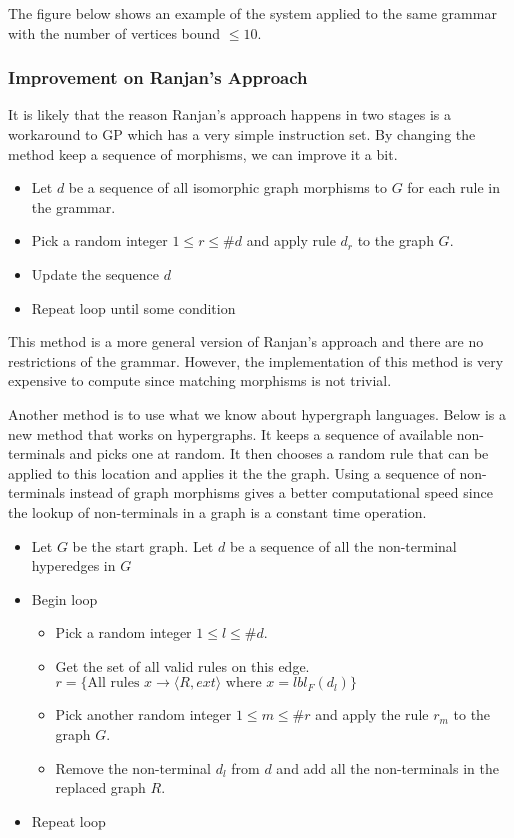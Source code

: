   The figure below shows an example of the system applied to the same grammar with the number of vertices bound $\leq 10$.
  


  \subsubsection{Improvement on Ranjan's Approach}

    It is likely that the reason Ranjan's approach happens in two stages is a workaround to GP which has a very simple instruction set. By changing the method keep a sequence of morphisms, we can improve it a bit.

    \begin{itemize}
    \item Let $d$ be a sequence of all isomorphic graph morphisms to $G$ for each rule in the grammar.
    \item Pick a random integer $1 \leq r \leq \#d$ and apply rule $d_r$ to the graph $G$.
    \item Update the sequence $d$
    \item Repeat loop until some condition
    \end{itemize}

    This method is a more general version of Ranjan's approach and there are no restrictions of the grammar. However, the implementation of this method is very expensive to compute since matching morphisms is not trivial.

    Another method is to use what we know about hypergraph languages. Below is a new method that works on hypergraphs. It keeps a sequence of available non-terminals and picks one at random. It then chooses a random rule that can be applied to this location and applies it the the graph. Using a sequence of non-terminals instead of graph morphisms gives a better computational speed since the lookup of non-terminals in a graph is a constant time operation.

    \begin{itemize}
    \item Let $G$ be the start graph. Let $d$ be a sequence of all the non-terminal hyperedges in $G$
    \item Begin loop
    \begin{itemize}
    \item Pick a random integer $1 \leq l \leq \#d$.
    \item Get the set of all valid rules on this edge. $r = \{\textrm{All rules $x \to \langle R, ext \rangle$ where $x = lbl_F(d_l)$\}}$
    \item Pick another random integer $1 \leq m \leq \#r$ and apply the rule $r_m$ to the graph $G$.
    \item Remove the non-terminal $d_l$ from $d$ and add all the non-terminals in the replaced graph $R$.
    \end{itemize}
    \item Repeat loop
    \end{itemize}

